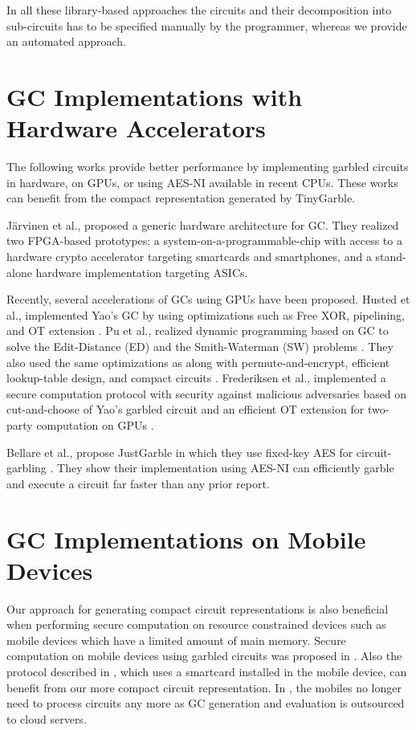 In all these library-based approaches the circuits and their decomposition into sub-circuits has to be specified manually by the programmer, whereas we provide an automated approach.

\section{GC Implementations with Hardware Accelerators}
The following works provide better performance by implementing garbled circuits in hardware, on GPUs, or using AES-NI available in recent CPUs.
These works can benefit from the compact representation generated by TinyGarble.

J\"arvinen et al., \cite{jarvinen2010garbled} proposed a generic hardware architecture for GC.
They realized two FPGA-based prototypes: a system-on-a-programmable-chip with access to a hardware crypto accelerator targeting smartcards and smartphones, and a stand-alone hardware implementation targeting ASICs.

Recently, several accelerations of GCs using GPUs have been proposed.
Husted et al., implemented Yao's GC by using optimizations such as Free XOR, pipelining, and OT extension \cite{husted2013gpu}.
Pu et al., realized dynamic programming based on GC to solve the Edit-Distance (ED) and the Smith-Waterman (SW) problems \cite{pu2013computing}.
They also used the same optimizations as \cite{husted2013gpu} along with permute-and-encrypt, efficient lookup-table design, and compact circuits \cite{pu2013computing}.
Frederiksen et al., implemented a secure computation protocol with security against malicious adversaries based on cut-and-choose of Yao's garbled circuit and an efficient OT extension for two-party computation on GPUs \cite{frederiksen2013fast}.

Bellare et al., propose JustGarble in which they use fixed-key AES for circuit-garbling \cite{bellare2013efficient}.
They show their implementation using AES-NI can efficiently garble and execute a circuit far faster than any prior report.

\section{GC Implementations on Mobile Devices}
Our approach for generating compact circuit representations is also beneficial when performing secure computation on resource constrained devices such as mobile devices which have a limited amount of main memory.
Secure computation on mobile devices using garbled circuits was proposed in \cite{huang2011privacy}.
Also the protocol described in \cite{demmler2014ad}, which uses a smartcard installed in the mobile device, can benefit from our more compact circuit representation.
In \cite{carter2016secure, carter2014whitewash}, the mobiles no longer need to process circuits any more as GC generation and evaluation is outsourced to cloud servers.

